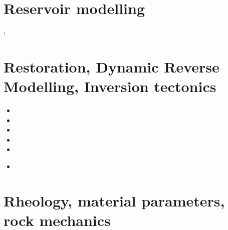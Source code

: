 \section{Reservoir modelling}

\begin{small}
\twothousandthirteen: 
\end{small}

\section{Restoration, Dynamic Reverse Modelling, Inversion tectonics}

\begin{small}
\begin{itemize}
\item[\twothousandone] 
\item[\twothousandfour] 
\item[\twothousandfive] 
\item[\twothousandtwelve] 
\item[\twothousandeighteen] 
\item[\twothousandtwenty] 
 \\
\end{itemize}
\end{small}

\section{Rheology, material parameters, rock mechanics}

